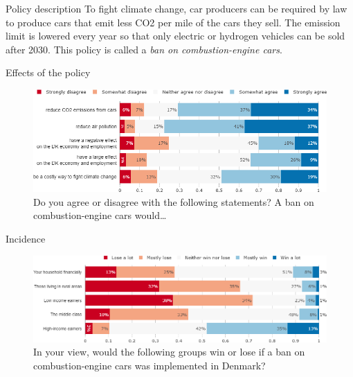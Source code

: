 \documentclass[aspectratio=169,9pt,dvipsnames]{beamer}
\begin{document}
\begin{frame}{Policy description}%
To fight climate change, car producers can be required by law to produce cars that emit less CO2 per mile of the cars they sell. The emission limit is lowered every year so that only electric or hydrogen vehicles can be sold after 2030. This policy is called a \textit{ban on combustion-engine cars}. 
\end{frame}


\begin{frame}{Effects of the policy}%

\begin{figure}[h!]
\centering
\caption{Do you agree or disagree with the following statements? A ban on combustion-engine cars would…}
\includegraphics[width=\textwidth]{../figures/DK/standard_effect_DK.png}
\end{figure}
\end{frame}

\begin{frame}{Incidence}%
\begin{figure}[h!]
\centering
\caption{In your view, would the following groups win or lose if a ban on combustion-engine cars was implemented in Denmark?}
\includegraphics[width=\textwidth]{../figures/DK/standard_win_lose_DK.png}
\end{figure}
\end{frame}
\end{document}
